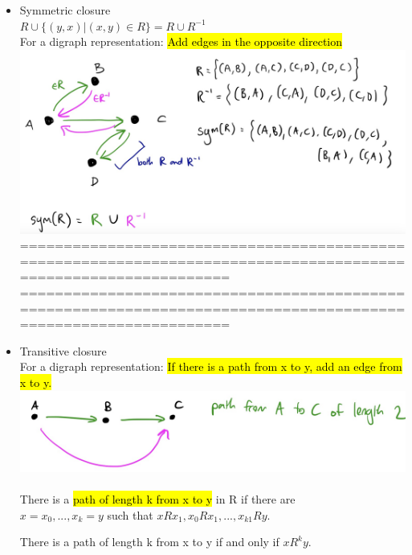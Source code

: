 \documentclass{article}
\begin{document}
\begin{itemize}
\item Symmetric closure\\
$R \cup \{(y,x) | (x,y) \in R\} = R \cup R^{-1}$\\
For a digraph representation: \hl{Add edges in the opposite direction}\\
\includegraphics[width=1.2\linewidth]{graph/15.jpg} \\%

================================================================================================================
\newpage
================================================================================================================\\

\item Transitive closure\\
For a digraph representation:
\hl{If there is a path from x to y, add an edge from x to y.}\\
\includegraphics[width=1.2\linewidth]{graph/16.jpg} \\%
\\
There is a \hl{path of length k from x to y} in R if there are\\
$x = x_0,..., x_k = y$ such that $xRx_1, x_0Rx_1, ..., x_{k1}Ry.$
\begin{center}
There is a path of length k from x to y if and only if $xR^{k}y$.
\end{center}


\end{itemize}
\end{document}
